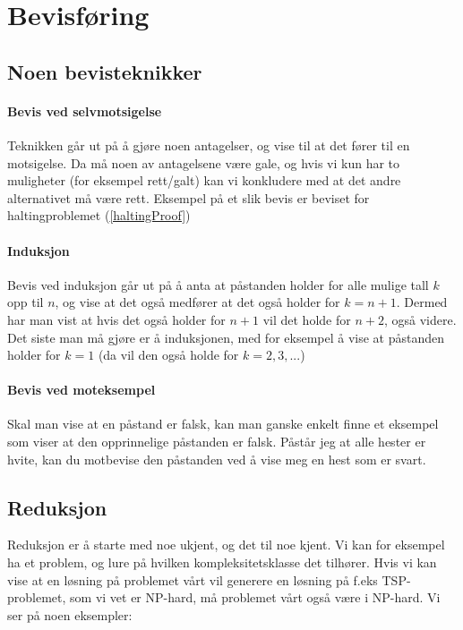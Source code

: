 \section{Bevisføring}
\subsection{Noen bevisteknikker}
\paragraph{Bevis ved selvmotsigelse}
Teknikken går ut på å gjøre noen antagelser, og vise til at det fører til en motsigelse. Da må noen av antagelsene være gale, og hvis vi kun har to muligheter (for eksempel rett/galt) kan vi konkludere med at det andre alternativet må være rett. Eksempel på et slik bevis er beviset for haltingproblemet (\ref{haltingProof})

\paragraph{Induksjon}
Bevis ved induksjon går ut på å anta at påstanden holder for alle mulige tall $ k $ opp til $ n $, og vise at det også medfører at det også holder for $ k = n+1 $. Dermed har man vist at hvis det også holder for $ n+1 $ vil det holde for $ n+2 $, også videre. Det siste man må gjøre er å  induksjonen, med for eksempel å vise at påstanden holder for $ k=1 $ (da vil den også holde for $ k=2, 3, ... $)

\paragraph{Bevis ved moteksempel}
Skal man vise at en påstand er falsk, kan man ganske enkelt finne et eksempel som viser at den opprinnelige påstanden er falsk. Påstår jeg at alle hester er hvite, kan du motbevise den påstanden ved å vise meg en hest som er svart.



\subsection{Reduksjon}
Reduksjon er å starte med noe ukjent, og  det til noe kjent. Vi kan for eksempel ha et problem, og lure på hvilken kompleksitetsklasse det tilhører. Hvis vi kan vise at en løsning på problemet vårt vil generere en løsning på f.eks TSP-problemet, som vi vet er NP-hard, må problemet vårt også være i NP-hard. Vi ser på noen eksempler:

